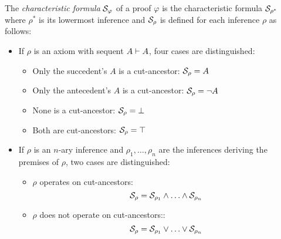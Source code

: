 \documentclass{llncs}
\begin{document}
\begin{definition}
\label{definition:PertinentStruct}
The \emph{characteristic formula} $\mathcal{S}_{\varphi}$ of a proof $\varphi$ is the characteristic formula $\mathcal{S}_{\rho^*}$ where $\rho^*$ is its lowermost inference and $\mathcal{S}_{\rho}$ is defined for each inference $\rho$ as follows:

\begin{itemize}
	\item If $\rho$ is an axiom with sequent $A \vdash A$, four cases are distinguished:
	\begin{itemize}	 	
	 	\item Only the succedent's $A$ is a cut-ancestor: $\mathcal{S}_{\rho} = A$
	 	\item Only the antecedent's $A$ is a cut-ancestor: $\mathcal{S}_{\rho} = \neg A $
	 	\item None is a cut-ancestor: $\mathcal{S}_{\rho} = \bot $
	 	\item Both are cut-ancestors: $\mathcal{S}_{\rho} = \top$
	\end{itemize}

	\item If $\rho$ is an $n$-ary inference and $\rho_1,\ldots,\rho_n$ are the inferences deriving the premises of $\rho$, two cases are distinguished:
	\begin{itemize}
		\item $\rho$ operates on cut-ancestors:
$$
\mathcal{S}_{\rho} = 
		\mathcal{S}_{\rho_1} \wedge \ldots \wedge \mathcal{S}_{\rho_n}
$$

	\item $\rho$ does not operate on cut-ancestors::
$$
\mathcal{S}_{\rho} = 
		\mathcal{S}_{\rho_1} \vee \ldots \vee \mathcal{S}_{\rho_n}
$$
	\end{itemize}
\end{itemize}
\end{definition}
\end{document}
